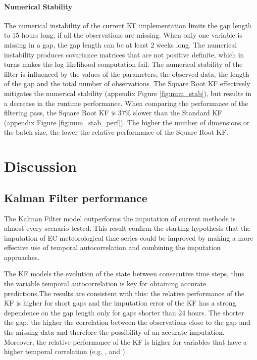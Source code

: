 \documentclass{article}
\let\Oldsection\section
\renewcommand{\section}{\FloatBarrier\Oldsection}
\let\Oldsubsection\subsection
\renewcommand{\subsection}{\FloatBarrier\Oldsubsection}
\begin{document}
\paragraph{Numerical Stability} The numerical instability of the current KF implementation limits the gap length to 15 hours long, if all the observations are missing. When only one variable is missing in a gap, the gap length can be at least 2 weeks long.
The numerical instability produces covariance matrices that are not positive definite, which in turns makes the log likelihood computation fail. The numerical stability of the filter is influenced by the values of the parameters, the observed data, the length of the gap and the total number of observations.
The Square Root KF effectively mitigates the numerical stability (appendix Figure \ref{fig:num_stab}), but results in a decrease in the runtime performance. When comparing the performance of the filtering pass, the Square Root KF is 37\% slower than the Standard KF (appendix Figure \ref{fig:num_stab_perf}). The higher the number of dimensions or the batch size, the lower the relative performance of the Square Root KF.

\section{Discussion}

\subsection{Kalman Filter performance}

The Kalman Filter model outperforms the imputation of current methods is almost every scenario tested. This result confirm the starting hypothesis that the imputation of EC meteorological time series could be improved by making a more effective use of temporal autocorrelation and combining the imputation approaches.

The KF models the evolution of the state between consecutive time steps, thus the variable temporal autocorrelation is key for obtaining accurate predictions.The results are consistent with this: the relative performance of the KF is higher for short gaps and the imputation error of the KF has a strong dependence on the gap length only for gaps shorter than 24 hours.  The shorter the gap, the higher the correlation between the observations close to the gap and the missing data and therefore the possibility of an accurate imputation. Moreover, the relative performance of the KF is higher for variables that have a higher temporal correlation (e.g. ,  and ).
\end{document}
